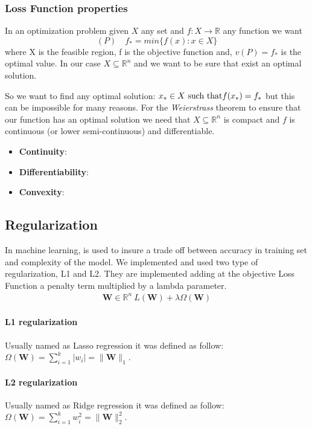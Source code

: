 \subsubsection{Loss Function properties}
\label{LF:Properties}
In an optimization problem given $X$ any set and $f: X \rightarrow \mathbb{R}$ any function we want
\begin{equation}
(P) \quad f_{*} = min \{f(x) : x \in X\}
\end{equation}
where X is the feasible region, f is the objective function and, $v(P) = f_{*}$ is the optimal value. In our case $X \subseteq \mathbb{R}^{n}$ and we want to be sure that exist an optimal solution.

So we want to find any optimal solution: $x_{*} \in X  \textnormal{ such that} f(x_{*}) = f_{*}$ but this can be impossible for many reasons. For the \textit{Weierstrass} theorem to ensure that our function has an optimal solution we need that $X \subseteq \mathbb{R}^{n}$ is compact and $f$ is continuous (or lower semi-continuous) and differentiable. 

\begin{itemize}
	\item \textbf{Continuity}:
	\item \textbf{Differentiability}:
	\item \textbf{Convexity}: 
\end{itemize}

\subsection{Regularization}
 In machine learning, is used to insure a trade off between accuracy in training set and complexity of the model.
 We implemented and used two type of regularization, L1 and L2. They are implemented adding at the objective Loss Function a penalty term multiplied by a lambda parameter.
\begin{align*}
	{\mathbf{W} \in \mathbb{R}^n} {\ \mathit{L}(\mathbf{W}) + \lambda\Omega(\mathbf{W})}{}{}
	\label{eq:reg}
\end{align*}
 
\paragraph*{L1 regularization}
Usually named as Lasso regression it was defined as follow:
$\Omega(\textbf{W}) = \sum_{i=1}^{k} |w_i| = \|\textbf{W}\|_1$.
\paragraph*{L2 regularization}
Usually named as Ridge regression it was defined as follow:
$\Omega(\textbf{W}) = \sum_{i=1}^{k}w_i^2 = \|\textbf{W}\|_2^2$. 
 
